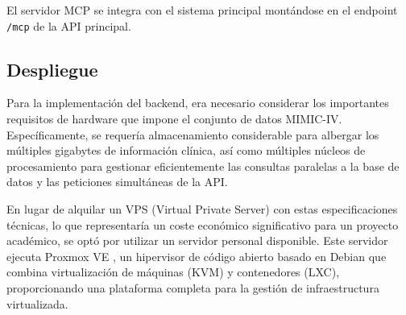 El servidor MCP se integra con el sistema principal montándose en el endpoint \texttt{/mcp} de la API principal.










\subsection{Despliegue}

Para la implementación del backend, era necesario considerar los importantes requisitos de hardware que impone el conjunto de datos MIMIC-IV. Específicamente, se requería almacenamiento considerable para albergar los múltiples gigabytes de información clínica, así como múltiples núcleos de procesamiento para gestionar eficientemente las consultas paralelas a la base de datos y las peticiones simultáneas de la API.

En lugar de alquilar un VPS (Virtual Private Server) con estas especificaciones técnicas, lo que representaría un coste económico significativo para un proyecto académico, se optó por utilizar un servidor personal disponible. Este servidor ejecuta Proxmox VE \cite{proxmox}, un hipervisor de código abierto basado en Debian que combina virtualización de máquinas (KVM) y contenedores (LXC), proporcionando una plataforma completa para la gestión de infraestructura virtualizada.


